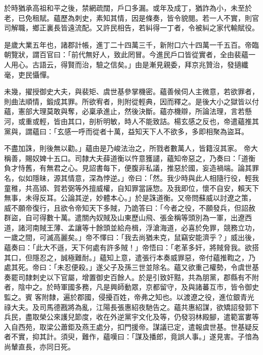 \begin{pinyinscope}
 於時猶承高祖和平之後，禁網疏闊，戶口多漏。或年及成丁，猶詐為小，未至於老，已免租賦。蘊歷為刺史，素知其情，因是條奏，皆令貌閱。若一人不實，則官司解職，鄉正裏長皆遠流配。又許民相告，若糾得一丁者，令被糾之家代輸賦役。



 是歲大業五年也，諸郡計帳，進丁二十四萬三千，新附口六十四萬一千五百。帝臨朝覽狀，謂百官曰：「前代無好人，致此罔冒。今進民戶口皆從實者，全由裴蘊一
 人用心。古語云，得賢而治，驗之信矣。」由是漸見親委，拜京兆贊治，發擿纖毫，吏民懾憚。



 未幾，擢授御史大夫，與裴矩、虞世基參掌機密。蘊善候伺人主微意，若欲罪者，則曲法順情，鍛成其罪。所欲宥者，則附從輕典，因而釋之。是後大小之獄皆以付蘊，憲部大理莫敢與奪，必稟承進止，然後決斷。蘊亦機辯，所論法理，言若懸河，或重或輕，皆由其口，剖析明敏，時人不能致詰。楊玄感之反也，帝遣蘊推其黨與，謂蘊曰：「玄感一呼而從者十萬，益知天下人不欲多，多即相聚為盜耳。



 不盡加誅，則後無以勸。」蘊由是乃峻法治之，所戮者數萬人，皆籍沒其家。
 帝大稱善，賜奴婢十五口。司隸大夫薛道衡以忤意獲譴，蘊知帝惡之，乃奏曰：「道衡負才恃舊，有無君之心。見詔書每下，便腹非私議，推惡於國，妄造禍端。論其罪名，似如隱昧，源其情意，深為悖逆。」帝曰：「然。我少時與此人相隨行役，輕我童稚，共高熲、賀若弼等外擅威權，自知罪當誣惣。及我即位，懷不自安，賴天下無事，未得反耳。公論其逆，妙體本心。」於是誅道衡。又帝問蘇威以討遼之策，威不願帝復行，且欲令帝知天下多賊，乃詭答曰：「今者之役，不願發兵，但詔赦群盜，自可得數十萬。遣關內奴賊及山東歷山飛、張金稱等頭別為一軍，出遼西
 道，諸河南賊王薄、孟讓等十餘頭並給舟楫，浮滄海道，必喜於免罪，競務立功，一歲之間，可滅高麗矣。」帝不懌曰：「我去尚猶未克，鼠竊安能濟乎？」威出後，蘊奏曰：「此大不遜，天下何處有許多賊！」帝悟曰：「老革多奸，將賊脅我。欲搭其口，但隱忍之，誠極難耐。」蘊知上意，遣張行本奏威罪惡，帝付蘊推鞫之，乃處其死。帝曰：「未忍便殺。」遂父子及孫三世並除名。蘊又欲重己權勢，令虞世基奏罷司隸刺史以下官屬，增置御史百餘人。於是引致奸黠，共為朋黨，郡縣有不附者，陰中之。於時軍國多務，凡是興師動眾，京都留守，及與諸蕃互市，皆令御史監之。賓
 客附隸，遍於郡國，侵擾百姓，帝弗之知也。以渡遼之役，進位銀青光祿大夫。及司馬德戡將為亂，江陽長張惠紹夜馳告之。蘊共惠紹謀，欲矯詔發郭下兵民，盡取榮公來護兒節度，收在外逆黨宇文化及等，仍發羽林殿腳，遣範富婁等入自西苑，取梁公蕭鉅及燕王處分，扣門援帝。謀議已定，遣報虞世基。世基疑反者不實，抑其計。須臾，難作，蘊嘆曰：「謀及播郎，竟誤人事。」遂見害。子愔為尚輦直長，亦同日死。




\end{pinyinscope}
